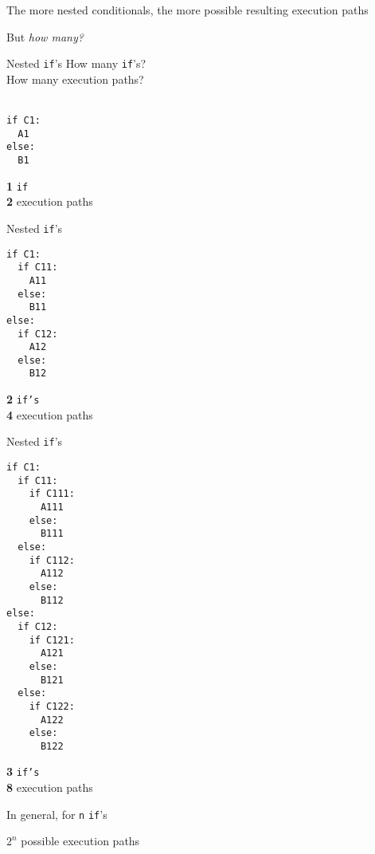 \documentclass{beamer}
\begin{document}
\begin{slide}{
\item The more nested conditionals, the more possible resulting execution paths
\item But \textit{how many?}
}\end{slide}

\begin{frame}[fragile]{Nested \texttt{if}'s}
How many \texttt{if}'s? \\ 
How many execution paths? \\ \ \\

\begin{lstlisting}[frame=shadowbox,basicstyle=\ttfamily\tiny]
if C1:
  A1
else:
  B1
\end{lstlisting}

\pause

\textbf{1} \texttt{if} \\
\textbf{2} execution paths \\
\end{frame}

\begin{frame}[fragile]{Nested \texttt{if}'s}
\begin{lstlisting}[frame=shadowbox,basicstyle=\ttfamily\tiny]
if C1:
  if C11:
    A11
  else:
    B11
else:
  if C12:
    A12
  else:
    B12
\end{lstlisting}

\pause

\textbf{2} \texttt{if's} \\
\textbf{4} execution paths \\
\end{frame}

\begin{frame}[fragile]{Nested \texttt{if}'s}
\begin{lstlisting}[frame=shadowbox,basicstyle=\ttfamily\tiny]
if C1:
  if C11:
    if C111:
      A111
    else:
      B111
  else:
    if C112:
      A112
    else:
      B112
else:
  if C12:
    if C121:
      A121
    else:
      B121
  else:
    if C122:
      A122
    else:
      B122
\end{lstlisting}

\pause

\textbf{3} \texttt{if's} \\
\textbf{8} execution paths \\
\end{frame}

\begin{slide}{
\item In general, for \texttt{n} \texttt{if}'s
\item $2^n$ possible execution paths 
}\end{slide}
\end{document}
